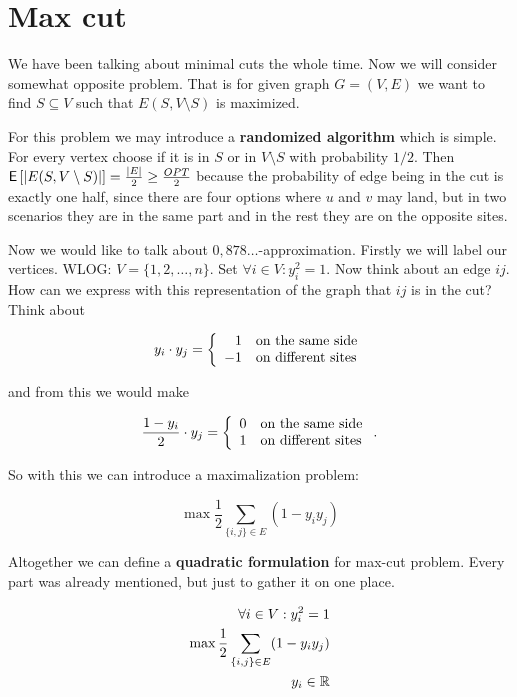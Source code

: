 \chapter{Max cut}

We have been talking about minimal cuts the whole time. Now we will consider somewhat opposite problem. That is for given graph $G = (V,E)$ we want to find $S \subseteq V$ such that $E(S, V \setminus S)$ is maximized.

For this problem we may introduce a \textbf{randomized algorithm} which is simple. For every vertex choose if it is in $S$ or in $V \setminus S$ with probability $1/2$. Then $\operatorname{\textsf{E}\,} [|E(S, V \setminus S)|] = \frac{|E|}{2} \geq \frac{OPT}{2}$ because the probability of edge being in the cut is exactly one half, since there are four options where $u$ and $v$ may land, but in two scenarios they are in the same part and in the rest they are on the opposite sites.

Now we would like to talk about $0,878\dots$-approximation. Firstly we will label our vertices. WLOG: $V = \{1, 2, \dots, n\}$. Set $\forall i \in V: y_{i}^2 =1$. Now think about an edge $ij$. How can we express with this representation of the graph that $ij$ is in the cut? Think about

$$
y_{i} \cdot y_{j} = \left\{
\begin{array}{r l}
	1 & \text{on the same side} \\
	-1 & \text{on different sites}
\end{array}
\right.
$$

and from this we would make

$$
\frac{1 - y_{i}}{2} \cdot y_{j} = \left\{
\begin{array}{r l}
	0 & \text{on the same side} \\
	1 & \text{on different sites}
\end{array}
\right..
$$

So with this we can introduce a maximalization problem:

$$
\max \frac{1}{2} \sum_{\{i,j\} \in E} (1 - y_i y_j)
$$

Altogether we can define a \textbf{quadratic formulation} for max-cut problem. Every part was already mentioned, but just to gather it on one place.

$$
\begin{aligned}
	\forall i \in V: y_{i}^2 = 1 \\
	\max \frac{1}{2} \sum_{\{i,j\} \in E} (1 - y_i y_j) \\
	y_{i} \in \mathbb{R}
\end{aligned}
$$

